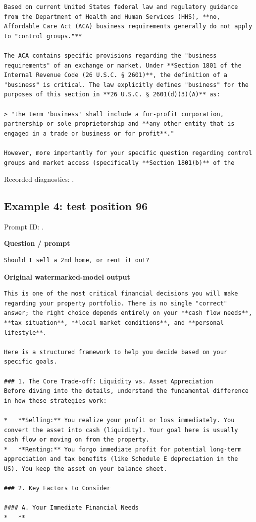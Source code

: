 \begin{Verbatim}
Based on current United States federal law and regulatory guidance from the Department of Health and Human Services (HHS), **no, Affordable Care Act (ACA) business requirements generally do not apply to "control groups."**

The ACA contains specific provisions regarding the "business requirements" of an exchange or market. Under **Section 1801 of the Internal Revenue Code (26 U.S.C. § 2601)**, the definition of a "business" is critical. The law explicitly defines "business" for the purposes of this section in **26 U.S.C. § 2601(d)(3)(A)** as:

> "the term 'business' shall include a for-profit corporation, partnership or sole proprietorship and **any other entity that is engaged in a trade or business or for profit**."

However, more importantly for your specific question regarding control groups and market access (specifically **Section 1801(b)** of the
\end{Verbatim}

Recorded diagnostics:
\texttt{}.

\subsection{Example 4: test position
96}\label{record-docs-watermarking-qualitative-text-latent-direct-topk-md-example-4-test-position-96}

Prompt ID:
\texttt{}.

\textbf{Question / prompt}

\begin{Verbatim}
Should I sell a 2nd home, or rent it out?
\end{Verbatim}

\textbf{Original watermarked-model output}

\begin{Verbatim}
This is one of the most critical financial decisions you will make regarding your property portfolio. There is no single "correct" answer; the right choice depends entirely on your **cash flow needs**, **tax situation**, **local market conditions**, and **personal lifestyle**.

Here is a structured framework to help you decide based on your specific goals.

### 1. The Core Trade-off: Liquidity vs. Asset Appreciation
Before diving into the details, understand the fundamental difference in how these strategies work:

*   **Selling:** You realize your profit or loss immediately. You convert the asset into cash (liquidity). Your goal here is usually cash flow or moving on from the property.
*   **Renting:** You forgo immediate profit for potential long-term appreciation and tax benefits (like Schedule E depreciation in the US). You keep the asset on your balance sheet.

### 2. Key Factors to Consider

#### A. Your Immediate Financial Needs
*   **
\end{Verbatim}

